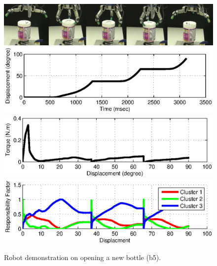 \begin{figure}
  \centering
  \includegraphics[width=15cm]{./fig/demo_b5.jpg}
  \includegraphics[width=15cm]{./fig/demo_b5_s.eps}
  \includegraphics[width=15cm]{./fig/demo_b5_T.eps}
  \includegraphics[width=15cm]{./fig/demo_b5_rf.eps}
  \caption{ \scriptsize{Robot demonstration on opening a new bottle (b5).}
}
\label{fig:demo_b5}
\end{figure}

